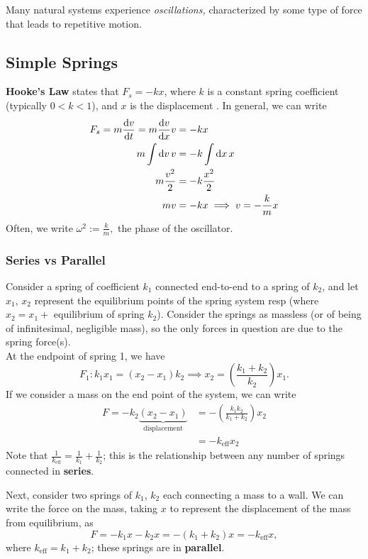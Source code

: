\documentclass[12pt]{article}
\begin{document}
Many natural systems experience \textit{oscillations,} characterized by some type of force that leads to repetitive motion.
\subsection{Simple Springs}

\textbf{Hooke's Law} states that $F_s = -kx$, where $k$ is a constant spring coefficient (typically $0 < k < 1$), and $x$ is the displacement . In general, we can write \begin{align*}
  F_s = m \dv{v}{t} = m \dv{v}{x}v &= - kx\\
  m\int \dd{v} v &= -k \int \dd{x} x\\
  m \frac{v^2}{2} &= -k \frac{x^2}{2}\\
  mv &= -kx \implies v = -\frac{k}{m}x
\end{align*}
Often, we write $\omega^2 := \frac{k}{m},$ the phase of the oscillator.\\
\subsubsection{Series vs Parallel}
Consider a spring of coefficient $k_1$ connected end-to-end to a spring of $k_2$, and let $x_1$, $x_2$ represent the equilibrium points of the spring system resp (where $x_2 = x_1 + $ equilibrium of spring $k_2$). Consider the springs as massless (or of being of infinitesimal, negligible mass), so the only forces in question are due to the spring force(s).\\
At the endpoint of spring 1, we have \[F_1 : k_1 x_1 = (x_2 - x_1)k_2 \implies x_2 = \left(\frac{k_1+k_2}{k_2}\right)x_1.\] If we consider a mass on the end point of the system, we can write \begin{align*}
  F = -k_2 \underbrace{(x_2 - x_1)}_{\text{displacement}} &= - \left(\frac{k_1 k_2}{k_1 +k_2}\right) x_2\\
  &= - k_{\text{eff}} x_2
\end{align*}
Note that $\frac{1}{k_\text{eff}} = \frac{1}{k_1}+\frac{1}{k_2}$; this is the relationship between any number of springs connected in \textbf{series}.

Next, consider two springs of $k_1$, $k_2$ each connecting a mass to a wall. We can write the force on the mass, taking $x$ to represent the displacement of the mass from equilibrium, as\[F = -k_1 x - k_2 x = -(k_1+k_2)x = - k_\text{eff} x,\]
where $k_\text{eff} = k_1 + k_2$; these springs are in \textbf{parallel}.
\end{document}
